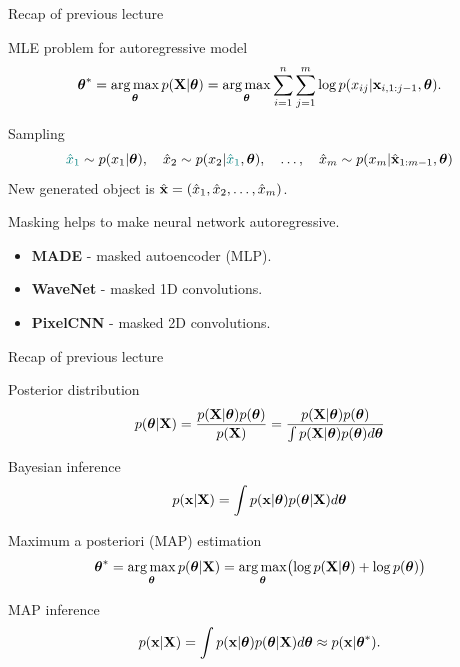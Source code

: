 

\begin{frame}
\titlepage
\end{frame}
\begin{frame}{Recap of previous lecture}
	\begin{block}{MLE problem for autoregressive model}
		\vspace{-0.7cm}
		\[
		\boldsymbol{\theta}^* = \operatorname*{arg\,max}_{\boldsymbol{\theta}} p(\mathbf{X} | \boldsymbol{\theta}) = \operatorname*{arg\,max}_{\boldsymbol{\theta}} \sum_{i=1}^n \sum_{j=1}^m \log p(x_{ij} | \mathbf{x}_{i, 1:j - 1}, \boldsymbol{\theta}).
		\]
		\vspace{-0.7cm}
	\end{block}
	\begin{block}{Sampling}
		\vspace{-0.5cm}
		\[
			{\color{teal}\hat{x}_1} \sim p(x_1 | \boldsymbol{\theta}), \quad \hat{x}_2 \sim p(x_2 | {\color{teal}\hat{x}_1}, \boldsymbol{\theta}), \quad \dots, \quad \hat{x}_m \sim p(x_m | \hat{\mathbf{x}}_{1:m-1}, \boldsymbol{\theta})
		\]
		New generated object is $\hat{\mathbf{x}} = (\hat{x}_1, \hat{x}_2, \dots, \hat{x}_m)$.
	\end{block}
	Masking helps to make neural network autoregressive.
	\begin{itemize}
		\item \textbf{MADE} - masked autoencoder (MLP).
		\item \textbf{WaveNet} - masked 1D convolutions.
		\item \textbf{PixelCNN} - masked 2D convolutions.
	\end{itemize}
\end{frame}
\begin{frame}{Recap of previous lecture}
	\begin{block}{Posterior distribution}
		\[
		p(\boldsymbol{\theta} | \mathbf{X}) = \frac{p(\mathbf{X} | \boldsymbol{\theta}) p(\boldsymbol{\theta})}{p(\mathbf{X})} = \frac{p(\mathbf{X} | \boldsymbol{\theta}) p(\boldsymbol{\theta})}{\int p(\mathbf{X} | \boldsymbol{\theta}) p(\boldsymbol{\theta}) d \boldsymbol{\theta}} 
		\]
		\vspace{-0.2cm}
	\end{block}
	\begin{block}{Bayesian inference}
		\vspace{-0.2cm}
		\[
		p(\mathbf{x} | \mathbf{X}) = \int p(\mathbf{x} | \boldsymbol{\theta}) p(\boldsymbol{\theta} | \mathbf{X}) d \boldsymbol{\theta}
		\]
		\vspace{-0.2cm}
	\end{block}
	\begin{block}{Maximum a posteriori (MAP) estimation}
		\vspace{-0.2cm}
		\[
		\boldsymbol{\theta}^* = \operatorname*{arg\,max}_{\boldsymbol{\theta}} p(\boldsymbol{\theta} | \mathbf{X}) = \operatorname*{arg\,max}_{\boldsymbol{\theta}} \bigl(\log p(\mathbf{X} | \boldsymbol{\theta}) + \log p(\boldsymbol{\theta}) \bigr)
		\]
		\vspace{-0.2cm}
	\end{block}
	\begin{block}{MAP inference}
		\[
		p(\mathbf{x} | \mathbf{X}) = \int p(\mathbf{x}| \boldsymbol{\theta}) p(\boldsymbol{\theta} | \mathbf{X} ) d \boldsymbol{\theta} \approx p(\mathbf{x} | \boldsymbol{\theta}^*).
		\]
	\end{block}
\end{frame}
